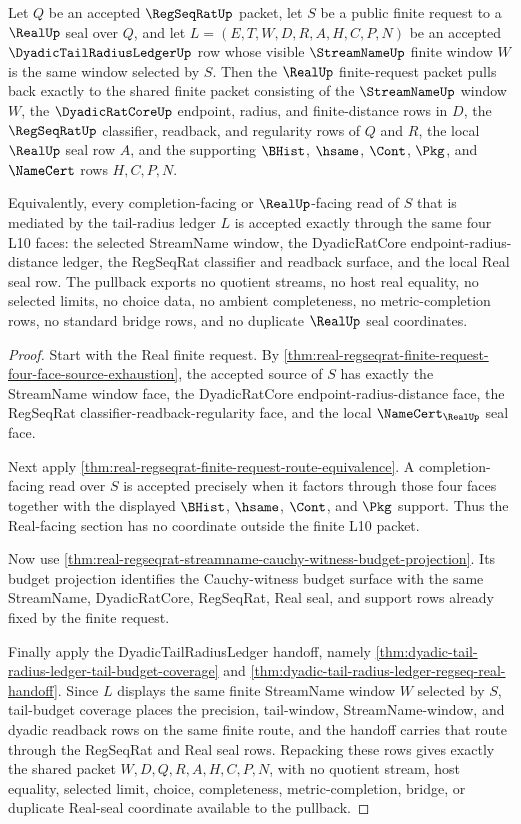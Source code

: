 \begin{theorem}
\label{thm:real-regseqrat-streamname-dyadic-tail-budget-pullback}
Let $Q$ be an accepted $\RegSeqRatUp$ packet, let $S$ be a public finite request to a $\RealUp$ seal over $Q$, and let $L=(E,T,W,D,R,A,H,C,P,N)$ be an accepted $\DyadicTailRadiusLedgerUp$ row whose visible $\StreamNameUp$ finite window $W$ is the same window selected by $S$. Then the $\RealUp$ finite-request packet pulls back exactly to the shared finite packet consisting of the $\StreamNameUp$ window $W$, the $\DyadicRatCoreUp$ endpoint, radius, and finite-distance rows in $D$, the $\RegSeqRatUp$ classifier, readback, and regularity rows of $Q$ and $R$, the local $\RealUp$ seal row $A$, and the supporting $\BHist$, $\hsame$, $\Cont$, $\Pkg$, and $\NameCert$ rows $H,C,P,N$.

Equivalently, every completion-facing or $\RealUp$-facing read of $S$ that is mediated by the tail-radius ledger $L$ is accepted exactly through the same four L10 faces: the selected StreamName window, the DyadicRatCore endpoint-radius-distance ledger, the RegSeqRat classifier and readback surface, and the local Real seal row. The pullback exports no quotient streams, no host real equality, no selected limits, no choice data, no ambient completeness, no metric-completion rows, no standard bridge rows, and no duplicate $\RealUp$ seal coordinates.
\end{theorem}
\begin{proof}
Start with the Real finite request. By \autoref{thm:real-regseqrat-finite-request-four-face-source-exhaustion}, the accepted source of $S$ has exactly the StreamName window face, the DyadicRatCore endpoint-radius-distance face, the RegSeqRat classifier-readback-regularity face, and the local $\NameCert_{\RealUp}$ seal face.

Next apply \autoref{thm:real-regseqrat-finite-request-route-equivalence}. A completion-facing read over $S$ is accepted precisely when it factors through those four faces together with the displayed $\BHist$, $\hsame$, $\Cont$, and $\Pkg$ support. Thus the Real-facing section has no coordinate outside the finite L10 packet.

Now use \autoref{thm:real-regseqrat-streamname-cauchy-witness-budget-projection}. Its budget projection identifies the Cauchy-witness budget surface with the same StreamName, DyadicRatCore, RegSeqRat, Real seal, and support rows already fixed by the finite request.

Finally apply the DyadicTailRadiusLedger handoff, namely \autoref{thm:dyadic-tail-radius-ledger-tail-budget-coverage} and \autoref{thm:dyadic-tail-radius-ledger-regseq-real-handoff}. Since $L$ displays the same finite StreamName window $W$ selected by $S$, tail-budget coverage places the precision, tail-window, StreamName-window, and dyadic readback rows on the same finite route, and the handoff carries that route through the RegSeqRat and Real seal rows. Repacking these rows gives exactly the shared packet $W,D,Q,R,A,H,C,P,N$, with no quotient stream, host equality, selected limit, choice, completeness, metric-completion, bridge, or duplicate Real-seal coordinate available to the pullback.
\end{proof}

